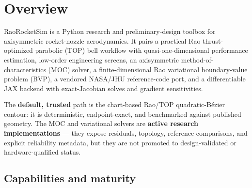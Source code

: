 \documentclass[11pt]{article}
\begin{document}
\section{Overview}

RaoRocketSim is a Python research and preliminary-design toolbox for
axisymmetric rocket-nozzle aerodynamics. It pairs a practical Rao
thrust-optimized parabolic (TOP) bell workflow with quasi-one-dimensional
performance estimation, low-order engineering screens, an axisymmetric
method-of-characteristics (MOC) solver, a finite-dimensional Rao variational
boundary-value problem (BVP), a vendored NASA/JHU reference-code port, and a
differentiable JAX backend with exact-Jacobian solves and gradient
sensitivities.

The \textbf{default, trusted} path is the chart-based Rao/TOP
quadratic-B\'ezier contour: it is deterministic, endpoint-exact, and
benchmarked against published geometry. The MOC and variational solvers are
\textbf{active research implementations} --- they expose residuals, topology,
reference comparisons, and explicit reliability metadata, but they are not
promoted to design-validated or hardware-qualified status.

\subsection{Capabilities and maturity}
\end{document}
